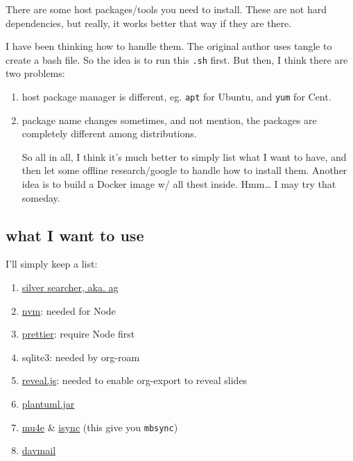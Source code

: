 \documentclass[11pt]{article}
\begin{document}
There are some host packages/tools you need to install. These are not
hard dependencies, but really, it works better that way if they are there.

I have been thinking how to handle them. The original author uses
tangle to create a bash file. So the idea is to run this \texttt{.sh}
first. But then, I think there are two problems:

\begin{enumerate}
\item host package manager is different, eg. \texttt{apt} for Ubuntu, and \texttt{yum} for Cent.
\item package name changes sometimes, and not mention, the packages are
completely different among distributions.

So all in all, I think it's much better to simply list what I want
to have, and then let some offline research/google to handle how to
install them. Another idea is to build a Docker image w/ all thest
inside. Hmm\ldots{} I may try that someday.
\end{enumerate}

\subsection{what I want to use}
\label{sec:org3bf0e73}

I'll simply keep a list:

\begin{enumerate}
\item \href{https://github.com/ggreer/the\_silver\_searcher}{silver searcher, aka. ag}
\item \href{https://github.com/nvm-sh/nvm}{nvm}: needed for Node
\item \href{https://prettier.io/docs/en/install.html}{prettier}: require Node first
\item sqlite3: needed by org-roam
\item \href{https://github.com/hakimel/reveal.js/}{reveal.js}: needed to enable org-export to reveal slides
\item \href{https://plantuml.com/download}{plantuml.jar}
\item \href{https://packages.ubuntu.com/search?keywords=mu4e}{mu4e} \& \href{https://packages.ubuntu.com/search?keywords=isync}{isync} (this give you \texttt{mbsync})
\item \href{https://github.com/mguessan/davmail}{davmail}
\end{enumerate}
\end{document}
